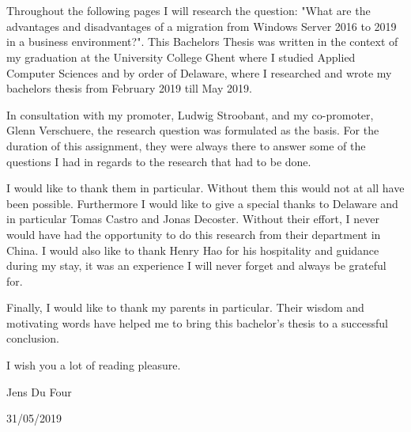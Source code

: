 
\chapter*{}
\label{ch:voorwoord}

Throughout the following pages I will research the question: "What are the advantages and disadvantages of a migration from Windows Server 2016 to 2019 in a business environment?". This Bachelors Thesis was written in the context of my graduation at the University College Ghent where I studied Applied Computer Sciences and by order of Delaware, where I researched and wrote my bachelors thesis from February 2019 till May 2019.

In consultation with my promoter, Ludwig Stroobant, and my co-promoter, Glenn Verschuere, the research question was formulated as the basis. For the duration of this assignment, they were always there to answer some of the questions I had in regards to the research that had to be done. 

I would like to thank them in particular. Without them this would not at all have been possible.
Furthermore I would like to give a special thanks to Delaware and in particular Tomas Castro and Jonas Decoster. Without their effort, I never would have had the opportunity to do this research from their department in China. I would also like to thank Henry Hao for his hospitality and guidance during my stay, it was an experience I will never forget and always be grateful for. 

Finally, I would like to thank my parents in particular. Their wisdom and motivating words have helped me to bring this bachelor's thesis to a successful conclusion.

I wish you a lot of reading pleasure.

Jens Du Four

31/05/2019